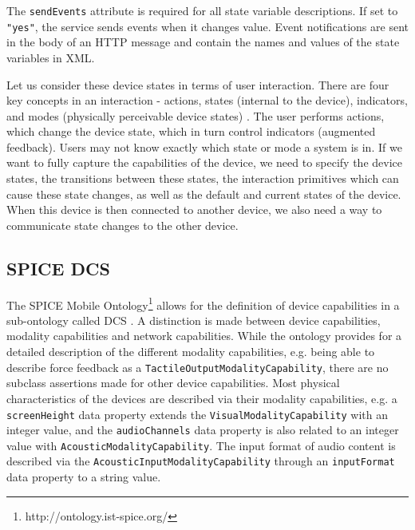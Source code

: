 The \texttt{sendEvents} attribute is required for all state variable descriptions. If set to \texttt{"yes"}, the service sends events when it changes value. Event notifications are sent in the body of an HTTP message and contain the names and values of the state variables in XML. 

Let us consider these device states in terms of user interaction. There are four key concepts in an interaction - actions, states (internal to the device), indicators, and modes (physically perceivable device states) \cite{Thimbleby2007}. The user performs actions, which change the device state, which in turn control indicators (augmented feedback). Users may not know exactly which state or mode a system is in.  If we want to fully capture the capabilities of the device, we need to specify the device states, the transitions between these states, the interaction primitives which can cause these state changes, as well as the default and current states of the device. When this device is then connected to another device, we also need a way to communicate state changes to the other device.




\subsection{SPICE DCS}
\label{spice}
The \ac{SPICE} Mobile Ontology\footnote{http://ontology.ist-spice.org/} allows for the definition of device capabilities in a sub-ontology called \ac{DCS} \cite{Villalonga2009}. A distinction is made between device capabilities, modality capabilities and network capabilities. While the ontology provides for a detailed description of the different modality capabilities, e.g. being able to describe force feedback as a \texttt{Tactile\-Output\-Modality\-Capability}, there are no subclass assertions made for other device capabilities. Most physical characteristics of the devices are described via their modality capabilities, e.g. a \texttt{screenHeight} data property extends the \texttt{VisualModalityCapability} with an integer value, and the \texttt{audio\-Channels} data property is also related to an integer value with \texttt{Acoustic\-Modality\-Capability}. The input format of audio content is described via the \texttt{Acoustic\-Input\-Modality\-Capability} through an \texttt{inputFormat} data property to a string value.


